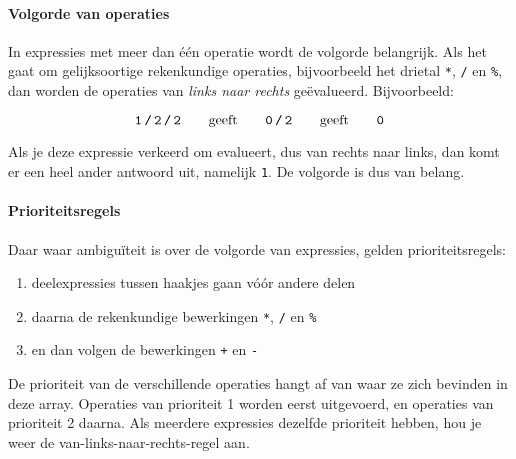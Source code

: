 \paragraph{Volgorde van operaties}

In expressies met meer dan \'e\'en operatie wordt de volgorde belangrijk. Als het gaat om gelijksoortige rekenkundige operaties, bijvoorbeeld het drietal \texttt{*}, \texttt{/} en \texttt{\%}, dan worden de operaties van \emph{links naar rechts} ge\"evalueerd. Bijvoorbeeld:

\begin{equation*}
\texttt{1\,/\,2\,/\,2} \qquad\text{geeft}\qquad \texttt{0\,/\,2} \qquad\text{geeft}\qquad \texttt{0}
\end{equation*}

Als je deze expressie verkeerd om evalueert, dus van rechts naar links, dan komt er een heel ander antwoord uit, namelijk \texttt{1}. De volgorde is dus van belang.

\paragraph{Prioriteitsregels}

Daar waar ambigu\"iteit is over de volgorde van expressies, gelden prioriteitsregels:

\begin{enumerate}
    \item deelexpressies tussen haakjes gaan v\'o\'or andere delen
    \item daarna de rekenkundige bewerkingen \texttt{*}, \texttt{/} en \texttt{\%}
    \item en dan volgen de bewerkingen \texttt{+} en \texttt{-}
\end{enumerate}

De prioriteit van de verschillende operaties hangt af van waar ze zich bevinden in deze array. Operaties van prioriteit 1 worden eerst uitgevoerd, en operaties van prioriteit 2 daarna. Als meerdere expressies dezelfde prioriteit hebben, hou je weer de van-links-naar-rechts-regel aan.
